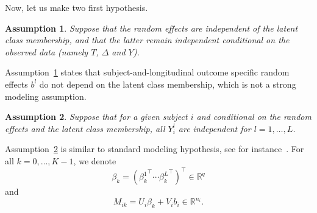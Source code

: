 \documentclass[11pt]{article}
\newtheorem{assumption}{Assumption}{\bf}{\rm}
\newcommand{\R}{\mathds R}
\begin{document}
Now, let us make two first hypothesis.
\begin{assumption}
\label{assumption1}
Suppose that the random effects are independent of the latent class membership, and that the latter remain independent conditional on the observed data (namely $T$, $\Delta$ and $Y$).
\end{assumption}
Assumption~\ref{assumption1} states that subject-and-longitudinal outcome specific random effects $b^l$ do not depend on the latent class membership, which is not a strong modeling assumption.
\begin{assumption}
\label{indep-hyp-2}
Suppose that for a given subject $i$ and conditional on the random effects and the latent class membership, all $Y_i^l$ are independent for $l=1, \dots, L$.
\end{assumption}
Assumption~\ref{indep-hyp-2} is similar to standard modeling hypothesis, see for instance~\citet{tsiatis2004joint}.
For all $k = 0, \ldots, K-1$, we denote 
\[ \beta_k = ({\beta_k^1}^\top \cdots {\beta_k^L}^\top)^\top \in \R^q \] 
and 
\[M_{ik} = U_i\beta_k + V_ib_i \in \R^{n_i}. \]
\end{document}
